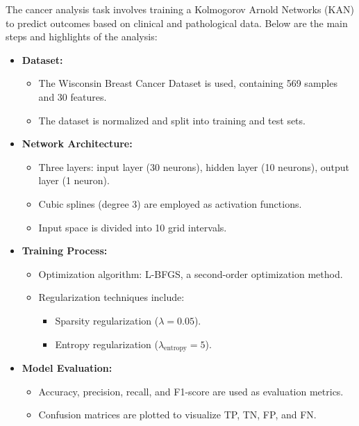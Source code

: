 The cancer analysis task involves training a Kolmogorov Arnold Networks (KAN) to predict outcomes based on clinical and pathological data. Below are the main steps and highlights of the analysis:

\begin{itemize}
    \item \textbf{Dataset:}
    \begin{itemize}
        \item The Wisconsin Breast Cancer Dataset is used, containing 569 samples and 30 features.
        \item The dataset is normalized and split into training and test sets.
    \end{itemize}

    \item \textbf{Network Architecture:}
    \begin{itemize}
        \item Three layers: input layer (30 neurons), hidden layer (10 neurons), output layer (1 neuron).
        \item Cubic splines (degree 3) are employed as activation functions.
        \item Input space is divided into 10 grid intervals.
    \end{itemize}

    \item \textbf{Training Process:}
    \begin{itemize}
        \item Optimization algorithm: L-BFGS, a second-order optimization method.
        \item Regularization techniques include:
        \begin{itemize}
            \item Sparsity regularization (\( \lambda = 0.05 \)).
            \item Entropy regularization (\( \lambda_{\text{entropy}} = 5 \)).
        \end{itemize}
    \end{itemize}

    \item \textbf{Model Evaluation:}
    \begin{itemize}
        \item Accuracy, precision, recall, and F1-score are used as evaluation metrics.
        \item Confusion matrices are plotted to visualize TP, TN, FP, and FN.
    \end{itemize}


\end{itemize}
